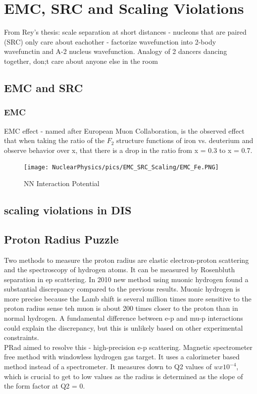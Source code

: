 \chapter{EMC, SRC and Scaling Violations}

    From Rey’s thesis:
    scale separation at short distances - nucleons that are paired (SRC) only care  about eachother - factorize wavefunction into 2-body wavefunctin and A-2 nucleus wavefunction. Analogy of 2 dancers dancing together, don;t care about anyone else in the room

    \section{EMC and SRC}
        \subsection{EMC}
            EMC effect - named after European Muon Collaboration, is the observed effect that when taking the ratio of the $F_2$ structure functions of iron vs. deuterium and observe behavior over x, that there is a drop in the ratio from x = 0.3 to x = 0.7.
            \begin{figure}[H]
                \centering
                \texttt{[image: NuclearPhysics/pics/EMC\_SRC\_Scaling/EMC\_Fe.PNG]}
            \caption{NN Interaction Potential}
            \end{figure}
            
    \section{scaling violations in DIS}




    \section{Proton Radius Puzzle}
        Two methods to measure the proton radius are elastic electron-proton scattering and the spectroscopy of hydrogen atoms. It can be measured by Rosenbluth separation in ep scattering. In 2010 new method using muonic hydrogen found a substantial discrepancy compared to the previous results. Muonic hydrogen is more precise because the Lamb shift is several million times more sensitive to the proton radius sense teh muon is about 200 times closer to the proton than in normal hydrogen. A fundamental difference between e-p and mu-p interactions could explain the discrepancy, but this is unlikely based on other experimental constraints.\\
        \newline
        \indent PRad aimed to resolve this - high-precision e-p scattering. Magnetic spectrometer free method with windowless hydrogen gas target. It uses a calorimeter based method instead of a spectrometer. It measures down to Q2 values of $wx10^{-4}$, which is crucial to get to low values as the radius is determined as the slope of the form factor at Q2 = 0. \\
        
